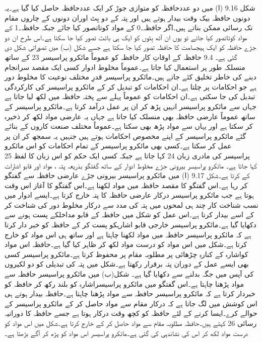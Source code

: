 	شکل 9.16 (ا) میں دو عددحافظہ کو متوازی جوڑ کر ایک عددحافظہ حاصل کیا گیا ہے۔یہ دونوں حافظہ بیک وقت بیدار ہوتے ہیں اور پتہ کے دو بِٹ اوران دونوں کے چاروں مقام تک رسائی ممکن بناتے ہیں۔اگر حافظہ۔0 کے مواد کوتاتصور کیا جائے جبکہ حافظہ۔1 کے مواد کوتاتصور کیا جائے تو یوں ان آٹھ بِٹوں کو ایک ہی بائٹ تصور کیا جا سکتا ہے۔اس طرح ان دو جڑے حافظہ کو ایک ہیجسامت کا حافظہ تصور کیا جا سکتا ہے جسے شکل (ب) میں تصوراتی شکل دی گئی ہے۔ 
9.4 حافظہ کے اوقاتِ کار
	حافظہ کو عموماً مائکرو پراسیسر 23 کے ساتھ منسلکہ طور پر استعمال کیا جاتا ہے۔عموماً مخلوط ادوار کسی ایک مقصد سرانجام دینے کی خاطر تخلیق کئے جاتے ہیں۔مائکرو پراسیسر قدرِ مختلف نوعیت کا مخلوط دور ہے جو احکامات پر چلتا ہے۔ان احکامات کو تبدیل کر کے  مائکرو پراسیسر کی کارکردگی تبدیل کی جا سکتی ہے۔ان احکامات کو عموماً پہلے سے پختہ حافظہ میں لکھ لیا جاتا ہے جہاں سے مائکرو پراسیسر انہیں پڑھ کر ان پر عمل درآمد کرتا ہے۔مائکرو پراسیسر کے ساتھ عموماً عارضی حافظہ بھی منسلک کیا جاتا ہے جہاں یہ عارضی مواد لکھ کر ذخیرہ کر سکتا ہے اور یہاں سے مواد پڑھ بھی سکتا ہے۔عموماً مختلف صنعت کاروں کے بنائے گئے مائکرو پراسیسر کے اپنے مخصوص احکامات ہوتے ہیں جنہیں یہ سمجھ کر ان پر عمل کر سکتا ہے۔کسی بھی مائکرو پراسیسر کے تمام احکامات کو اس مائکرو پراسیسر کی مادری زبان 24 کہا جاتا ہے جبکہ کسی ایک حکم کو اس زبان کا لفظ 25 کہا جاتا ہے۔
	مائکرو پراسیسر بیرونی جڑے مخلوط ادوار کے ساتھ گفتگو بذریعہ پتہ ، مواد اور قابو اشارات کے کرتا ہے۔شکل 9.17 (ا) میں مائکرو پراسیسر بیرونی جڑے عارضی حافظہ سے گفتگو کر رہا ہے۔اس گفتگو کا مقصد حافظہ میں مواد لکھنا ہے۔اس گفتگو کا آغاز اس وقت ہوتا ہے جب  مائکرو پراسیسر درکار عارضی حافظہ کا پتہ خارج کرتا ہے۔ایسے ادوار میں نسب شناخت کار چند ہی لمحوں میں پتہ کی مدد سے درکار مخلوط دور کی شناخت کر کے اسے بیدار کرتا ہے۔اس عمل کو شکل میں حافظہ کے قابو مداخلکے پست ہونے سے دکھایا گیا ہے۔مائکرو پراسیسر خارجی قابو اشارہکو پست کر کے حافظہ کو خبر دار کرتا ہے کہ مائکرو پراسیسر حافظہ میں مواد لکھنا چاہتا ہے اور ساتھ ہی اس مواد کو خارج کرتا ہے۔شکل میں اس مواد کو درست مواد لکھ کر ظاہر کیا گیا ہے۔حافظہ اس مواد کواشارہ کے کنارہِ چڑھائی پر مطلوبہ مقام پر محفوظ کرتا ہے۔مائکرو پراسیسر کسی بھی ایسے  عمل کے دوران  پتہ برقرار رکھتا ہے۔شکل میں پتہ کی تبدیلی کو دو لکیروں کی آپس میں جگہ بدلنے سے دکھایا گیا ہے۔
	شکل(ب) میں مائکرو پراسیسر حافظہ سے مواد پڑھنا چاہتا ہے۔اس گفتگو میں مائکرو پراسیسراشارہ کو بلند رکھ کر حافظہ کو خبردار کرتا ہے کہ مائکرو پراسیسر حافظہ سے مواد پڑھنا چاہتا ہے۔حافظہ بیدار ہوتے ہی اس کوشش میں لگ جاتا ہے کہ درکار مقام سے مواد حاصل کر کے مائکرو پراسیسر کے حوالے کرے۔ایسا کرنے کے لئے حافظہ کو کچھ وقت درکار ہوتا ہے جسے  حافظہ کا دورانیہ رسائی 26 کہتے ہیں۔حافظہ مطلوبہ مقام سے مواد حاصل کر کے خارج کرتا ہے۔شکل میں اس مواد کو درست مواد لکھ کر اس کی نشاندہی کی گئی ہے۔مائکرو پراسیسر اس مواد کو پڑھ کر آگے بڑھتا ہے۔

